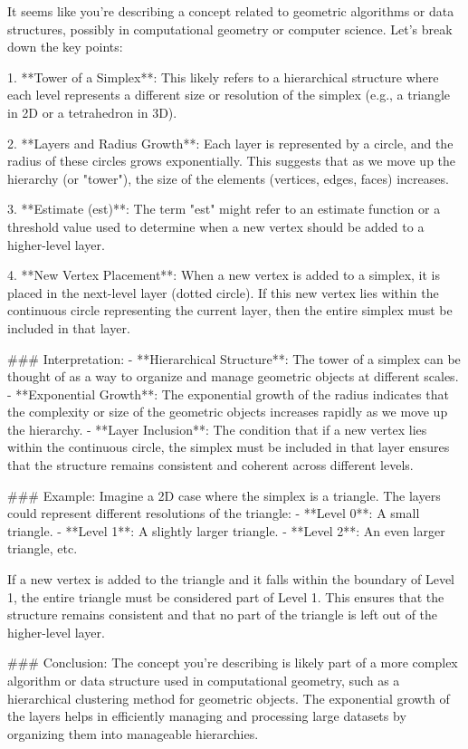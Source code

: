 It seems like you're describing a concept related to geometric algorithms or data structures, possibly in computational geometry or computer science. Let's break down the key points:

1. **Tower of a Simplex**: This likely refers to a hierarchical structure where each level represents a different size or resolution of the simplex (e.g., a triangle in 2D or a tetrahedron in 3D).

2. **Layers and Radius Growth**: Each layer is represented by a circle, and the radius of these circles grows exponentially. This suggests that as we move up the hierarchy (or "tower"), the size of the elements (vertices, edges, faces) increases.

3. **Estimate (est)**: The term "est" might refer to an estimate function or a threshold value used to determine when a new vertex should be added to a higher-level layer.

4. **New Vertex Placement**: When a new vertex is added to a simplex, it is placed in the next-level layer (dotted circle). If this new vertex lies within the continuous circle representing the current layer, then the entire simplex must be included in that layer.

### Interpretation:
- **Hierarchical Structure**: The tower of a simplex can be thought of as a way to organize and manage geometric objects at different scales.
- **Exponential Growth**: The exponential growth of the radius indicates that the complexity or size of the geometric objects increases rapidly as we move up the hierarchy.
- **Layer Inclusion**: The condition that if a new vertex lies within the continuous circle, the simplex must be included in that layer ensures that the structure remains consistent and coherent across different levels.

### Example:
Imagine a 2D case where the simplex is a triangle. The layers could represent different resolutions of the triangle:
- **Level 0**: A small triangle.
- **Level 1**: A slightly larger triangle.
- **Level 2**: An even larger triangle, etc.

If a new vertex is added to the triangle and it falls within the boundary of Level 1, the entire triangle must be considered part of Level 1. This ensures that the structure remains consistent and that no part of the triangle is left out of the higher-level layer.

### Conclusion:
The concept you're describing is likely part of a more complex algorithm or data structure used in computational geometry, such as a hierarchical clustering method for geometric objects. The exponential growth of the layers helps in efficiently managing and processing large datasets by organizing them into manageable hierarchies.